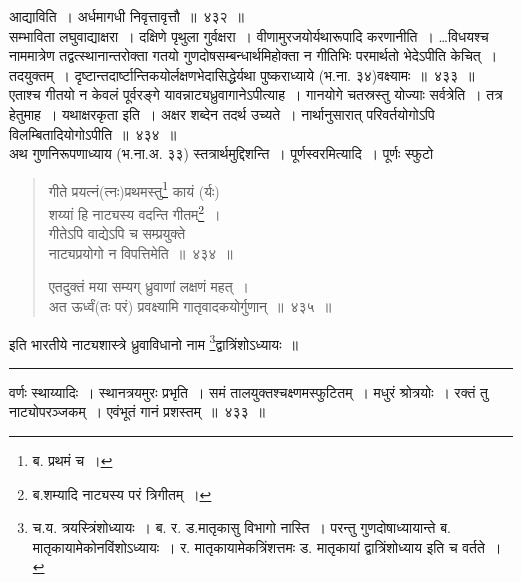\documentclass[11pt, openany]{book}
\begin{document}
{\qtt आद्याविति}~। अर्धमागधी निवृत्तावृत्तौ~॥~४३२~॥\\

{\qtt सम्भाविता लघुवाद्याक्षरा~। दक्षिणे पृथुला गुर्वक्षरा}~। वीणामुरजयोर्यथारूपादि करणानीति~। \ldots विधयश्च नाममात्रेण तद्वत्स्थानान्तरोक्ता गतयो गुणदोषसम्बन्धार्थमिहोक्ता न गीतिभिः परमार्थतो भेदेऽपीति केचित्~। {\qtt तदयुक्तम्}~। दृष्टान्तदार्ष्टान्तिकयोर्लक्षणभेदासिद्धेर्यथा पुष्कराध्याये (भ.ना. ३४)वक्ष्यामः~॥~४३३~॥\\

एताश्च गीतयो न केवलं पूर्वरङ्गे यावन्नाट्यध्रुवागानेऽपीत्याह~। {\qtt गानयोगे चतस्रस्तु योज्याः} सर्वत्रेति~। तत्र हेतुमाह~। यथाक्षरकृता इति~। अक्षर शब्देन तदर्थ उच्यते~। नार्थानुसारात् परिवर्तयोगोऽपि विलम्बितादियोगोऽपीति~॥~४३४~॥\\

अथ {\qtt गुणनिरूपणाध्याय} (भ.ना.अ. ३३) स्तत्रार्थमुद्दिशन्ति~। {\qtt पूर्णस्वरमित्यादि}~। पूर्णः स्फुटो 

\newpage

\begin{quote}
{\na गीते प्रयत्नं(त्नः)प्रथमस्तु\renewcommand{\thefootnote}{1}\footnote{ब. प्रथमं च~।} कायं (र्यः) \\
 शय्यां हि नाट्यस्य वदन्ति गीतम्\renewcommand{\thefootnote}{2}\footnote{ब.शम्यादि नाट्यस्य परं त्रिगीतम्~।}~।\\
 गीतेऽपि वाद्येऽपि च सम्प्रयुक्ते\\
 नाट्यप्रयोगो न विपत्तिमेति~॥~४३४~॥

 एतदुक्तं मया सम्यग् ध्रुवाणां लक्षणं महत्~।\\
 अत ऊर्ध्वं(तः परं) प्रवक्ष्यामि गातृवादकयोर्गुणान्~॥~४३५~॥}
\end{quote}

\begin{center}
इति भारतीये नाट्यशास्त्रे ध्रुवाविधानो नाम \renewcommand{\thefootnote}{3}\footnote{च.य. त्रयस्त्रिंशोध्यायः~। ब. र. ड.मातृकासु विभागो नास्ति~। परन्तु गुणदोषाध्यायान्ते ब. मातृकायामेकोनविंशोऽध्यायः~। र. मातृकायामेकत्रिंशत्तमः ड. मातृकायां द्वात्रिंशोध्याय इति च वर्तते~।}द्वात्रिंशोऽध्यायः~॥
\end{center}

\hrule

\vspace{2mm}
\noindent
वर्णः स्थाय्यादिः~। {\qtt स्थानत्रयमुरः} प्रभृति~। {\qtt समं} तालयुक्तश्चक्ष्णमस्फुटितम्~। {\qtt मधुरं} श्रोत्रयोः~। {\qtt रक्तं} तु नाट्योपरञ्जकम्~। एवंभूतं गानं प्रशस्तम्~॥~४३३~॥\\
\end{document}
